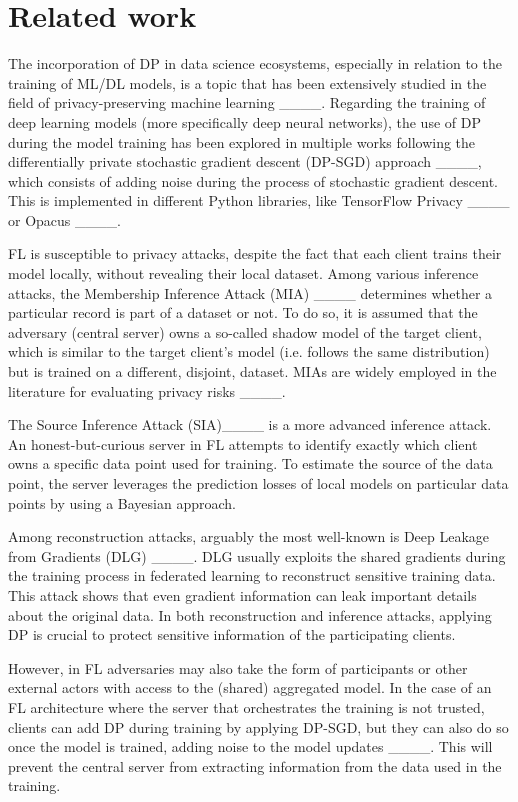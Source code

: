 \section{Related work}
\label{sec:sota}

The incorporation of DP in data science ecosystems, especially in relation to the training of ML/DL models, is a topic that has been extensively studied in the field of privacy-preserving machine learning ____. Regarding the training of deep learning models (more specifically deep neural networks), the use of DP during the model training has been explored in multiple works following the differentially private stochastic gradient descent (DP-SGD) approach ____, which consists of adding noise during the process of stochastic gradient descent. This is implemented in different Python libraries, like TensorFlow Privacy ____ or Opacus ____. 

FL is susceptible to privacy attacks, despite the fact that each client trains their model locally, without revealing their local dataset.
Among various inference attacks, the Membership Inference Attack (MIA)  ____ determines whether a particular record is part of a dataset or not.  To do so, it is assumed that the adversary (central server) owns a so-called shadow model of the target client, which is similar to the target client’s model (i.e. follows the same distribution) but is trained on a different, disjoint, dataset.
MIAs are widely employed in the literature for evaluating privacy risks ____.

The Source Inference Attack (SIA)____ is a more advanced inference attack. An honest-but-curious server in FL attempts to identify exactly which client owns a specific data point used for training. To estimate the source of the data point, the server leverages the prediction losses of local models on particular data points by using a Bayesian approach. 


Among reconstruction attacks, arguably the most well-known is Deep Leakage from Gradients (DLG) ____. DLG usually exploits the shared gradients during the training process in federated learning to reconstruct sensitive training data. This attack shows that even gradient information can leak important details about the original data. In both reconstruction and inference attacks, applying DP is crucial to protect sensitive information of the participating clients.

However, in FL adversaries may also take the form of participants or other external actors with access to the (shared) aggregated model. In the case of an FL architecture where the server that orchestrates the training is not trusted, clients can add DP during training by applying DP-SGD, but they can also do so once the model is trained, adding noise to the model updates ____. This will prevent the central server from extracting information from the data used in the training. 

